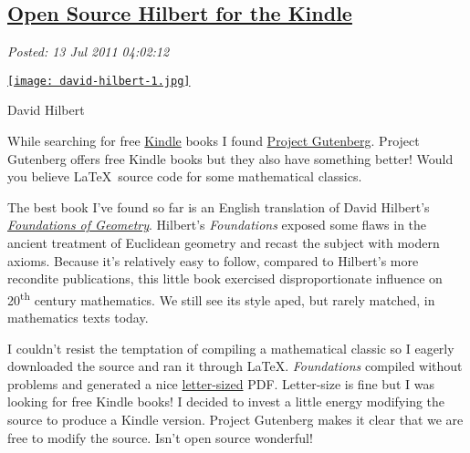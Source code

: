 %

\subsection*{\href{https://bakerjd99.wordpress.com/2011/07/12/open-source-hilbert-for-the-kindle/}{Open Source Hilbert for the Kindle}}


\noindent\emph{Posted: 13 Jul 2011 04:02:12}
\vspace{6pt}


\captionsetup[floatingfigure]{labelformat=empty}
\begin{floatingfigure}[l]{0.24\textwidth}
\centering
\href{http://www.nndb.com/people/735/000087474/}{\texttt{[image: david-hilbert-1.jpg]}}
\caption{David  Hilbert}
\label{fig:1463X0}
\end{floatingfigure}While searching for free
\href{http://www.amazon.com/Kindle-Wireless-Reader-Wifi-Graphite/dp/B002Y27P3M}{Kindle}
books I found \href{http://www.gutenberg.org/wiki/Main\_Page}{Project
Gutenberg}. Project Gutenberg offers free Kindle books but they also
have something better! Would you believe \LaTeX\ source code for
some mathematical classics.

The best book I've found so far is an English translation of David
Hilbert's \href{http://www.gutenberg.org/ebooks/17384}{\emph{Foundations
of Geometry}}. Hilbert's \emph{Foundations} exposed some flaws in the
ancient treatment of Euclidean geometry and recast the subject with
modern axioms. Because it's relatively easy to follow, compared to
Hilbert's more recondite publications, this little book exercised
disproportionate influence on 20\textsuperscript{th} century mathematics. We still see its
style aped, but rarely matched, in mathematics texts today.

I couldn't resist the temptation of compiling a mathematical classic so
I eagerly downloaded the source and ran it through \LaTeX.
\emph{Foundations} compiled without problems and generated a nice
\href{http://en.wikipedia.org/wiki/Letter\_(paper\_size)}{letter-sized}
PDF. Letter-size is fine but I was looking for free Kindle books! I
decided to invest a little energy modifying the source to produce a
Kindle version. Project Gutenberg makes it clear that we are free to
modify the source. Isn't open source wonderful!

